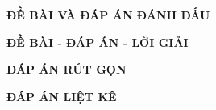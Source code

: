 \documentclass[11pt]{article}
\begin{document}
\setlength{\baselineskip}{12truept}
\def\v#1{\overrightarrow{#1}} %
\lamtieude
{}
\indebai
\begin{enumerate}[]
\foreachproblem[bttracnghiem]{\item\causo\thisproblem}
\end{enumerate}
\label{dbPage}

\newpage
\setcounter{page}{1}
%
\lamtieude
\indebaidapan
\begin{center}
{\bf ĐỀ BÀI VÀ ĐÁP ÁN ĐÁNH DẤU}
\end{center}
\begin{enumerate}[]
\foreachproblem[bttracnghiem]{\item\causo\thisproblem}
\end{enumerate}
\label{dbdaPage}

\newpage
\setcounter{page}{1}
%
\lamtieude
\indebailoigiai
\begin{center}
{\bf ĐỀ BÀI - ĐÁP ÁN - LỜI GIẢI}
\end{center}
\begin{enumerate}[]
\foreachproblem[bttracnghiem]{\item\causo\thisproblem}
\end{enumerate}
\label{dblgPage}

\newpage
\lamtieude
\indapanrutgon
\thispagestyle{empty}
\begin{center}
{\bf ĐÁP ÁN RÚT GỌN}
\end{center}
\begin{multicols}{3}
\begin{enumerate}[\causo]
\foreachproblem[bttracnghiem]{\item\thisproblem}
\end{enumerate}
\end{multicols}


\newpage
\lamtieude
\indapanlietke
\thispagestyle{empty}
\begin{center}
{\bf ĐÁP ÁN LIỆT KÊ}
\end{center}

\begin{multicols}{5}
\begin{enumerate}[\causo]
\foreachproblem[bttracnghiem]{\item\thisproblem}
\end{enumerate}
\end{multicols}
\end{document}
